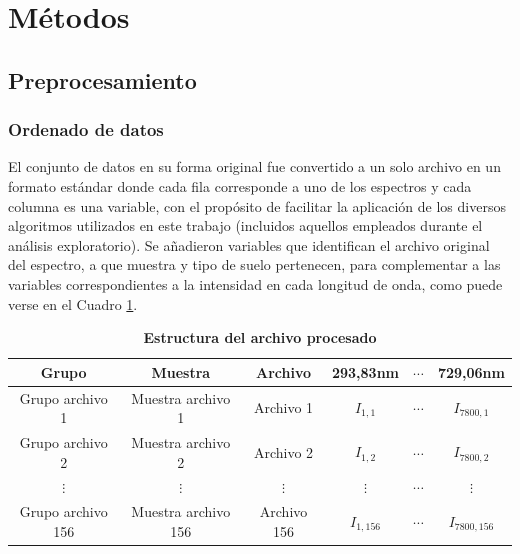 \documentclass[12pt]{article}
\begin{document}

\section{Métodos}
\subsection{Preprocesamiento}
\subsubsection{Ordenado de datos}
El conjunto de datos en su forma original fue convertido a un solo archivo en un formato estándar donde cada fila corresponde a uno de los espectros y cada columna es una variable, con el propósito de facilitar la aplicación de los diversos algoritmos utilizados en este trabajo (incluidos aquellos empleados durante el análisis exploratorio). Se añadieron variables que identifican el archivo original del espectro, a que muestra y tipo de suelo pertenecen, para complementar a las variables correspondientes a la intensidad en cada longitud de onda, como puede verse en el Cuadro \ref{table:tidy}.

\begin{table}[ht]
\centering
\begin{tabular}{|c|c|c|c|c|c|}
\hline
Grupo    & Muestra     & Archivo & 293,83nm & $\cdots$ & 729,06nm \\ \hline
Grupo archivo 1    & Muestra archivo 1     & Archivo 1 & $I_{1,1}$ & $\cdots$ & $I_{7800,1}$ \\ \hline
Grupo archivo 2    & Muestra archivo 2     & Archivo 2 & $I_{1,2}$ & $\cdots$ & $I_{7800,2}$ \\ \hline
$\vdots$ & $\vdots$ & $\vdots$ & $\vdots$ & $\cdots$ & $\vdots$ \\ \hline
Grupo archivo 156    & Muestra archivo 156 & Archivo 156 & $I_{1,156}$ & $\cdots$ & $I_{7800,156}$ \\ \hline
\end{tabular}
\caption{\textbf{Estructura del archivo procesado}}
\label{table:tidy}
\end{table}
\end{document}
